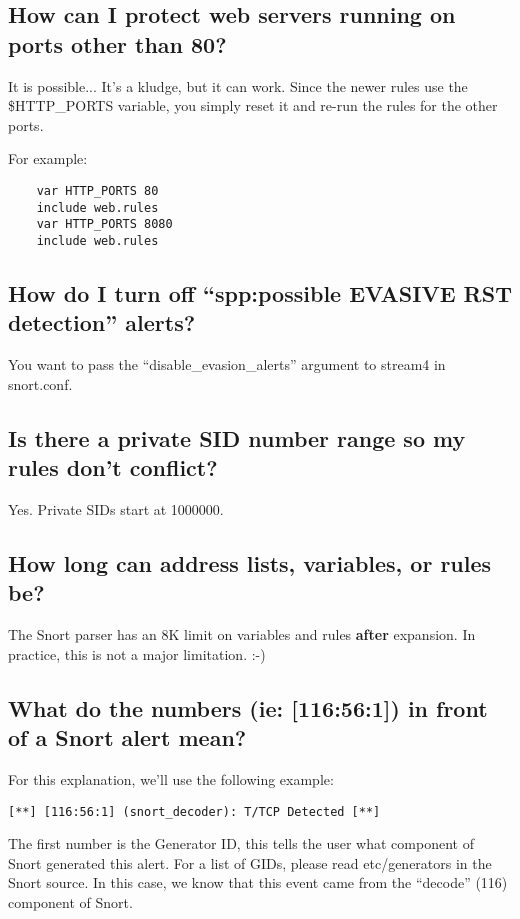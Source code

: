 \documentclass{article}
\begin{document}
\subsection{How can I protect web servers running on ports other than 80?}

It is possible... It's a kludge, but it can work. Since the newer rules use
the \$HTTP\_PORTS variable, you simply reset it and re-run the rules for the other
ports.

For example:
\begin{verbatim}
    var HTTP_PORTS 80
    include web.rules
    var HTTP_PORTS 8080
    include web.rules
\end{verbatim}

\subsection{How do I turn off ``spp:possible EVASIVE RST detection'' alerts?}

You want to pass the ``disable\_evasion\_alerts'' argument to stream4 in
snort.conf.

\subsection{Is there a private SID number range so my rules don't conflict?}

Yes. Private SIDs start at 1000000.

\subsection{How long can address lists, variables, or rules be?}

The Snort parser has an 8K limit on variables and rules {\bf after} expansion. In
practice, this is not a major limitation. :-)

\subsection{What do the numbers (ie: [116:56:1]) in front of a Snort alert mean?}

For this explanation, we'll use the following example:
\begin{verbatim}
[**] [116:56:1] (snort_decoder): T/TCP Detected [**]
\end{verbatim}
The first number is the Generator ID, this tells the user what component
of Snort generated this alert. For a list of GIDs, please read
etc/generators in the Snort source. In this case, we know that this event
came from the ``decode'' (116) component of Snort.
\end{document}
